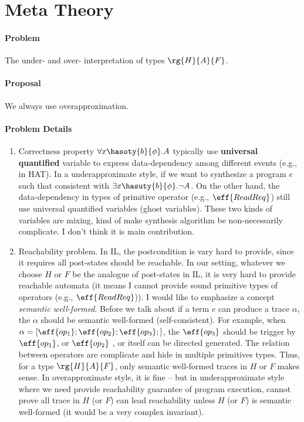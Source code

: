 \section{Meta Theory}

\paragraph{Problem} The under- and over- interpretation of types $\rg{H}{A}{F}$.
\paragraph{Proposal} We always use overapproximation.
\paragraph{Problem Details}
\begin{enumerate}
    \item Correctness property $\forall x\hasoty{b}{\phi}.A$ typically use \textbf{universal quantified} variable to express data-dependency among different events (e.g., in HAT). In a underapproximate style, if we want to synthesize a program $e$ such that consistent with $\exists x\hasuty{b}{\phi}.\neg A$. On the other hand, the data-dependency in types of primitive operator (e.g., $\eff{ReadReq}$) still use universal quantified variables (ghost variables). These two kinds of variables are mixing, kind of make synthesis algorithm be non-necessarily complicate. I don't think it is main contribution.
    \item Reachability problem. In IL, the postcondition is vary hard to provide, since it requires all post-states should be reachable. In our setting, whatever we choose $H$ or $F$ be the analogue of post-states in IL, it is very hard to provide reachable automata (it means I cannot provide sound primitive types of operators (e.g., $\eff{ReadReq}$)). I would like to emphasize a concept \emph{semantic well-formed}. Before we talk about if a term $e$ can produce a trace $\alpha$, the $\alpha$ should be semantic well-formed (self-consistent). For example, when $\alpha = [\eff{op_1};\eff{op_2};\eff{op_3};]$, the $\eff{op_3}$ should be trigger by $\eff{op_1}$, or $\eff{op_2}$ , or itself can be directed generated. The relation between operators are complicate and hide in multiple primitives types. Thus, for a type $\rg{H}{A}{F}$, only semantic well-formed traces in $H$ or $F$ makes sense. In overapproximate style, it is fine -- but in underapproximate style where we need provide reachability guarantee of program execution, cannot prove all trace in $H$ (or $F$) can lead reachability unless $H$ (or $F$) is semantic well-formed (it would be a very complex invariant).
\end{enumerate}
